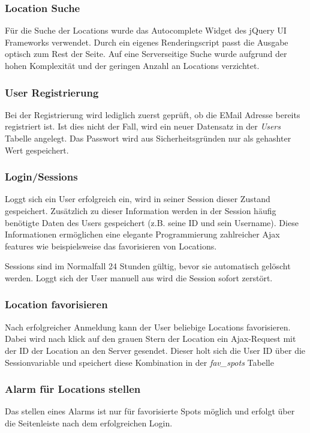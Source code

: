 \documentclass{report}
\begin{document}
\subsubsection{Location Suche}
Für die Suche der Locations wurde das Autocomplete Widget des jQuery UI Frameworks verwendet. Durch ein eigenes Renderingscript passt die Ausgabe optisch zum Rest der Seite. Auf eine Serverseitige Suche wurde aufgrund der hohen Komplexität und der geringen Anzahl an Locations verzichtet.

\subsubsection{User Registrierung}
Bei der Registrierung wird lediglich zuerst geprüft, ob die EMail Adresse bereits registriert ist. Ist dies nicht der Fall, wird ein neuer Datensatz in der \emph{Users} Tabelle angelegt. Das Passwort wird aus Sicherheitsgründen nur als gehashter Wert gespeichert.

\subsubsection{Login/Sessions}
Loggt sich ein User erfolgreich ein, wird in seiner Session dieser Zustand gespeichert. Zusätzlich zu dieser Information werden in der Session häufig benötigte Daten des Users gespeichert (z.B. seine ID und sein Username). Diese Informationen ermöglichen eine elegante Programmierung zahlreicher Ajax features wie beispielsweise das favorisieren von Locations.

Sessions sind im Normalfall 24 Stunden gültig, bevor sie automatisch gelöscht werden. Loggt sich der User manuell aus wird die Session sofort zerstört.

\subsubsection{Location favorisieren}
Nach erfolgreicher Anmeldung kann der User beliebige Locations favorisieren. Dabei wird nach klick auf den grauen Stern der Location ein Ajax-Request mit der ID der Location an den Server gesendet. Dieser holt sich die User ID über die Sessionvariable und speichert diese Kombination in der \emph{fav\_spots} Tabelle

\subsubsection{Alarm für Locations stellen}
Das stellen eines Alarms ist nur für favorisierte Spots möglich und erfolgt über die Seitenleiste nach dem erfolgreichen Login. 
\end{document}
